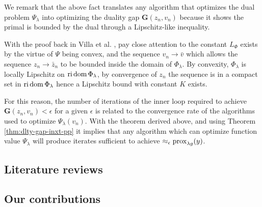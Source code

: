 \documentclass[12pt]{article}
\begin{document}
        We remark that the above fact translates any algorithm that optimizes the dual problem $\Psi_\lambda$ into optimizing the duality gap $\mathbf G(z_n, v_n)$ because it shows the primal is bounded by the dual through a Lipschitz-like inequality. 
        \par
        With the proof back in Villa et al. \cite[Theorem 5.1]{villa_accelerated_2013}, pay close attention to the constant $L_\Phi$ exists by the virtue of $\Psi$ being convex, and the sequence $v_n \rightarrow \bar v$ which allows the sequence $z_n \rightarrow \bar z_n$ to be bounded inside the domain of $\Phi_\lambda$. 
        By convexity, $\Phi_\lambda$ is locally Lipschitz on $\operatorname{ri} \operatorname{dom} \Phi_\lambda$, by convergence of $z_n$ the sequence is in a compact set in $\operatorname{ri}\operatorname{dom} \Phi_\lambda$ hence a Lipschitz bound with constant $K$ exists. 
        \par
        For this reason, the number of iterations of the inner loop required to achieve $\mathbf G(z_n, v_n) < \epsilon$ for a given $\epsilon$ is related to the convergence rate of the algorithms used to optimize $\Psi_\lambda(v_n)$. 
        With the theorem derived above, and using Theorem \ref{thm:dlty-gap-inxt-pp} it implies that any algorithm which can optimize function value $\Psi_\lambda$ will produce iterates sufficient to achieve $\approx_\epsilon \operatorname{prox}_{\lambda g}(y)$. 
    \subsection{Literature reviews}

    \subsection{Our contributions}
\end{document}
